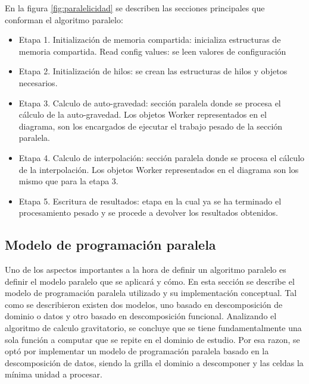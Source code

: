 \documentclass[a4paper,11pt]{book}
\begin{document}

En la figura \ref{fig:paralelicidad} se describen las secciones principales que conforman el algoritmo paralelo:
\begin{itemize}
	\item Etapa 1. Initialización de memoria compartida: inicializa estructuras de memoria compartida. Read config values: se leen valores de configuración
	\item Etapa 2. Initialización de hilos: se crean las estructuras de hilos y objetos necesarios.
	\item Etapa 3. Calculo de auto-gravedad: sección paralela donde se procesa el cálculo de la auto-gravedad. Los objetos Worker representados en el diagrama, son los encargados de ejecutar el trabajo pesado de la sección paralela.
	\item Etapa 4. Calculo de interpolación: sección paralela donde se procesa el cálculo de la interpolación. Los objetos Worker representados en el diagrama son los mismo que para la etapa 3.
	\item Etapa 5. Escritura de resultados: etapa en la cual ya se ha terminado el procesamiento pesado y se procede a devolver los resultados obtenidos.
\end{itemize}

\subsection{Modelo de programación paralela}
Uno de los aspectos importantes a la hora de definir un algoritmo paralelo es definir el modelo paralelo que se aplicará y cómo. En esta sección se describe el modelo de programación paralela utilizado y su implementación conceptual.\newline
Tal como se describieron existen dos modelos, uno basado en descomposición de dominio o datos y otro basado en descomposición funcional. Analizando el algoritmo de calculo gravitatorio, se concluye que se tiene fundamentalmente una sola función a computar que se repite en el dominio de estudio.
Por esa razon, se optó por implementar un modelo de programación paralela basado en la descomposición de datos, siendo la grilla el dominio a descomponer y las celdas la mínima unidad a procesar.\newline
\end{document}
